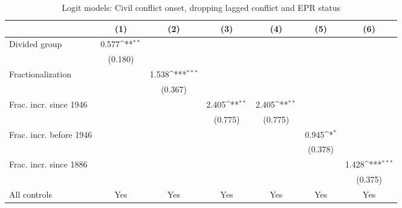 \begin{table}[htbp]\centering
\def\sym#1{\ifmmode^{#1}\else\(^{#1}\)\fi}
\caption{Logit models: Civil conflict onset, dropping lagged conflict and EPR status \label{tab:robptreat}}
\begin{tabular}{l*{6}{c}}
\hline\hline
                    &\multicolumn{1}{c}{(1)}         &\multicolumn{1}{c}{(2)}         &\multicolumn{1}{c}{(3)}         &\multicolumn{1}{c}{(4)}         &\multicolumn{1}{c}{(5)}         &\multicolumn{1}{c}{(6)}         \\
\hline
Divided group       &       0.577\sym{**} &                     &                     &                     &                     &                     \\
                    &     (0.180)         &                     &                     &                     &                     &                     \\
Fractionalization   &                     &       1.538\sym{***}&                     &                     &                     &                     \\
                    &                     &     (0.367)         &                     &                     &                     &                     \\
Frac. incr. since 1946&                     &                     &       2.405\sym{**} &       2.405\sym{**} &                     &                     \\
                    &                     &                     &     (0.775)         &     (0.775)         &                     &                     \\
Frac. incr. before 1946&                     &                     &                     &                     &       0.945\sym{*}  &                     \\
                    &                     &                     &                     &                     &     (0.378)         &                     \\
Frac. incr. since 1886&                     &                     &                     &                     &                     &       1.428\sym{***}\\
                    &                     &                     &                     &                     &                     &     (0.375)         \\
\hline
All controls        &         Yes         &         Yes         &         Yes         &         Yes         &         Yes         &         Yes         \\

\end{tabular}
\end{table}
